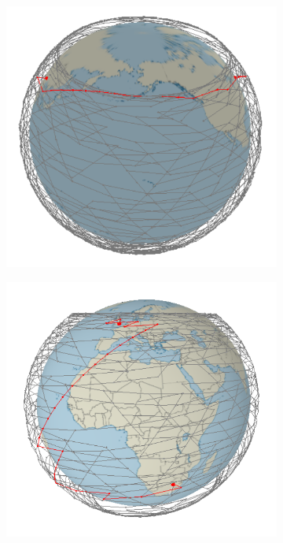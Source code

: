 \documentclass[12pt,a4paper,twoside,openright]{report}
\begin{document}
\begin{figure}
	\begin{subfigure}[b]{0.4\textwidth}
		\includegraphics[width=\textwidth]{NewYorkBeijing1320SatellitesLM2}
	\end{subfigure}
	\hfill
	\begin{subfigure}[b]{0.4\textwidth}
		\includegraphics[width=\textwidth]{LondonJohannasburg1254SatellitesLM2}
	\end{subfigure}
\end{figure}
\end{document}

